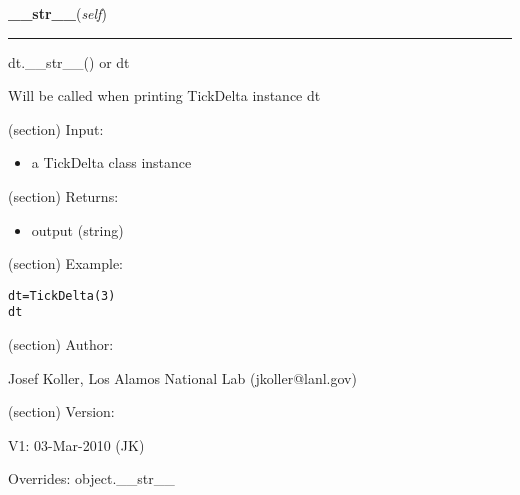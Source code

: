     \vspace{0.5ex}

\hspace{.8\funcindent}\begin{boxedminipage}{\funcwidth}

    \raggedright \textbf{\_\_str\_\_}(\textit{self})

    \vspace{-1.5ex}

    \rule{\textwidth}{0.5\fboxrule}
\setlength{\parskip}{2ex}
    dt.\_\_str\_\_() or dt

    Will be called when printing TickDelta instance dt

    (section) Input:

      \begin{itemize}
      \setlength{\parskip}{0.6ex}
        \item a TickDelta class instance

      \end{itemize}

    (section) Returns:

      \begin{itemize}
      \setlength{\parskip}{0.6ex}
        \item output (string)

      \end{itemize}

    (section) Example:

\begin{alltt}
\pysrcprompt{{\textgreater}{\textgreater}{\textgreater} }dt = TickDelta(3)
\pysrcprompt{{\textgreater}{\textgreater}{\textgreater} }dt
\end{alltt}
    (section) Author:

      Josef Koller, Los Alamos National Lab (jkoller@lanl.gov)

    (section) Version:

      V1: 03-Mar-2010 (JK)

\setlength{\parskip}{1ex}
      Overrides: object.\_\_str\_\_

    \end{boxedminipage}

    \vspace{0.5ex}


